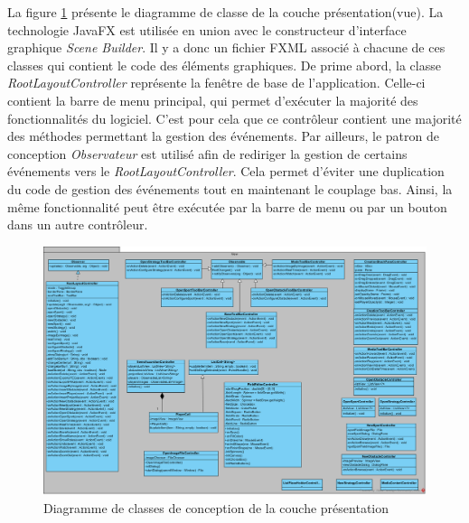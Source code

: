 La figure \ref{fig:vue_classes_conception_diag} présente le diagramme de classe de la couche présentation(vue).
La technologie JavaFX est utilisée en union avec le constructeur d'interface graphique \textit{Scene Builder}.
Il y a donc un fichier FXML associé à chacune de ces classes qui contient le code des éléments graphiques.
De prime abord, la classe \textit{RootLayoutController} représente la fenêtre de base de l'application.
Celle-ci contient la barre de menu principal, qui permet d'exécuter la majorité des fonctionnalités du logiciel.
C'est pour cela que ce contrôleur contient une majorité des méthodes permettant la gestion des événements.
Par ailleurs, le patron de conception \textit{Observateur} est utilisé afin de rediriger la gestion de certains événements vers le \textit{RootLayoutController}.
Cela permet d'éviter une duplication du code de gestion des événements tout en maintenant le couplage bas.
Ainsi, la même fonctionnalité peut être exécutée par la barre de menu ou par un bouton dans un autre contrôleur.


\begin{figure}[htpb]
    \centering
    \includegraphics[scale=0.4]{fig/classe_conception_view.png}
    \caption{Diagramme de classes de conception de la couche présentation}
    \label{fig:vue_classes_conception_diag}
\end{figure}

